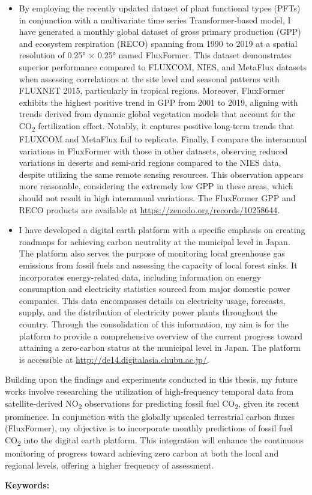 \begin{itemize}
    \item By employing the recently updated dataset of plant functional types (PFTs) in conjunction with a multivariate time series Transformer-based model, I have generated a monthly global dataset of gross primary production (GPP) and ecosystem respiration (RECO) spanning from 1990 to 2019 at a spatial resolution of 0.25° × 0.25° named FluxFormer. This dataset demonstrates superior performance compared to FLUXCOM, NIES, and MetaFlux datasets when assessing correlations at the site level and seasonal patterns with FLUXNET 2015, particularly in tropical regions. Moreover, FluxFormer exhibits the highest positive trend in GPP from 2001 to 2019, aligning with trends derived from dynamic global vegetation models that account for the CO\textsubscript{2} fertilization effect. Notably, it captures positive long-term trends that FLUXCOM and MetaFlux fail to replicate. Finally, I compare the interannual variations in FluxFormer with those in other datasets, observing reduced variations in deserts and semi-arid regions compared to the NIES data, despite utilizing the same remote sensing resources. This observation appears more reasonable, considering the extremely low GPP in these areas, which should not result in high interannual variations. The FluxFormer GPP and RECO products are available at \url{https://zenodo.org/records/10258644}.
    \item I have developed a digital earth platform with a specific emphasis on creating roadmaps for achieving carbon neutrality at the municipal level in Japan. The platform also serves the purpose of monitoring local greenhouse gas emissions from fossil fuels and assessing the capacity of local forest sinks. It incorporates energy-related data, including information on energy consumption and electricity statistics sourced from major domestic power companies. This data encompasses details on electricity usage, forecasts, supply, and the distribution of electricity power plants throughout the country. Through the consolidation of this information, my aim is for the platform to provide a comprehensive overview of the current progress toward attaining a zero-carbon status at the municipal level in Japan. The platform is accessible at \url{http://de14.digitalasia.chubu.ac.jp/}.
\end{itemize}

Building upon the findings and experiments conducted in this thesis, my future works involve researching the utilization of high-frequency temporal data from satellite-derived NO\textsubscript{2} observations for predicting fossil fuel CO\textsubscript{2}, given its recent prominence. In conjunction with the globally upscaled terrestrial carbon fluxes (FluxFormer), my objective is to incorporate monthly predictions of fossil fuel CO\textsubscript{2} into the digital earth platform. This integration will enhance the continuous monitoring of progress toward achieving zero carbon at both the local and regional levels, offering a higher frequency of assessment. \par

\vspace*{5truemm}
\begin{flushleft}
 {\bfseries Keywords:}
\end{flushleft}\ekeywords
